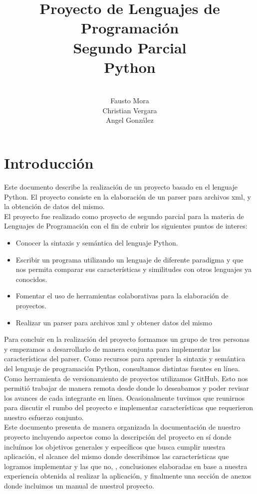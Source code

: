 \documentclass[11pt]{article} %
\title{Proyecto de Lenguajes de Programaci\'on \\ Segundo Parcial \\ Python}
\author{\\Fausto Mora \\Christian Vergara \\ Angel Gonz\'alez}
\begin{document}

\maketitle

\newpage
\thispagestyle{empty}
\tableofcontents

\newpage
\thispagestyle{empty}


\section{\textbf{Introducción}}

Este documento describe la realizaci\'on de un proyecto basado en el lenguaje Python. El proyecto consiste en la elaboraci\'on de un parser para archivos xml, y la obtenci\'on de datos del mismo.
\\El proyecto fue realizado como proyecto de segundo parcial para la materia de Lenguajes de Programaci\'on con el fin de cubrir los siguientes puntos de interes:
\begin{itemize}
\item Conocer la sintaxis y semántica del lenguaje Python.
\item Escribir un programa utilizando un lenguaje de diferente paradigma y que nos permita comparar sus características y similitudes con otros lenguajes ya conocidos.
\item Fomentar el uso de herramientas colaborativas para la elaboraci\'on de proyectos.
\item Realizar un parser para archivos xml y obtener datos del mismo
\end{itemize}
Para concluir en la realizaci\'on del proyecto formamos un grupo de tres personas y empezamos a desarrollarlo de manera conjunta para implementar las caracter\'isticas del parser. Como recursos para aprender la sintaxis y sem\'antica del lenguaje de programaci\'on Python, consultamos distintas fuentes en l\'inea. Como herramienta de versionamiento de proyectos utilizamos GitHub. Esto nos permiti\'o trabajar de manera remota desde donde lo deseabamos y poder revisar los avances de cada integrante en l\'inea. Ocasionalmente tuvimos que reunirnos para discutir el rumbo del proyecto e implementar caracter\'isticas que requerieron nuestro esfuerzo conjunto.
\\Este documento presenta de manera organizada la documentaci\'on de nuestro proyecto incluyendo aspectos como la descripci\'on del proyecto en s\'i donde inclu\'imos los objetivos generales y espec\'ificos que busca cumplir nuestra aplicaci\'on, el alcance del mismo donde describimos las caracter\'isticas que logramos implementar y las que no, , conclusiones elaboradas en base a nuestra experiencia obtenida al realizar la aplicaci\'on, y finalmente una secci\'on de anexos donde incluimos un manual de nuestrol proyecto.
\end{document}
